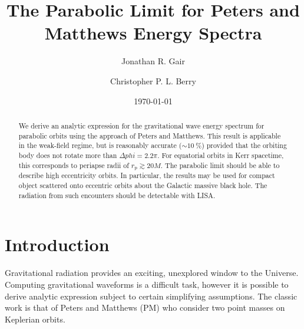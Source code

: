 \documentclass[aps,prd,reprint,showpacs,groupedaddress]{revtex4-1}
\newcommand{\sub}[1]{\ensuremath{_\text{#1}}}
\begin{document}

\title{The Parabolic Limit for Peters and Matthews Energy Spectra}

\author{Jonathan R. Gair}
\author{Christopher P. L. Berry}

\date{\today}

\begin{abstract}
We derive an analytic expression for the gravitational wave energy spectrum for parabolic orbits using the approach of Peters and Matthews. This result is applicable in the weak-field regime, but is reasonably accurate ($\sim \SI{10}{\percent}$) provided that the orbiting body does not rotate more than $\Delta phi = 2.2\pi$. For equatorial orbits in Kerr spacetime, this corresponds to periapse radii of $r\sub{p} \gtrsim 20 M$. The parabolic limit should be able to describe high eccentricity orbits. In particular, the results may be used for compact object scattered onto eccentric orbits about the Galactic massive black hole. The radiation from such encounters should be detectable with LISA.
\end{abstract}


\maketitle

\section{Introduction}

Gravitational radiation provides an exciting, unexplored window to the Universe. Computing gravitational waveforms is a difficult task, however it is possible to derive analytic expression subject to certain simplifying assumptions. The classic work is that of Peters and Matthews\cite{Peters1963, Peters1964} (PM) who consider two point masses on Keplerian orbits.
\end{document}
